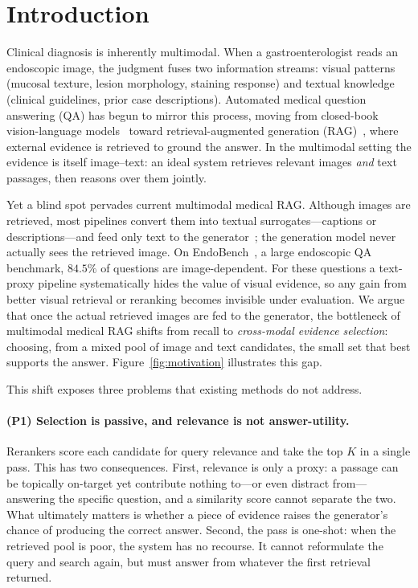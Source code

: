 \section{Introduction}
\label{sec:introduction}

Clinical diagnosis is inherently multimodal. When a gastroenterologist reads an
endoscopic image, the judgment fuses two information streams: visual patterns
(mucosal texture, lesion morphology, staining response) and textual knowledge
(clinical guidelines, prior case descriptions). Automated medical question
answering (QA) has begun to mirror this process, moving from closed-book
vision-language models~\cite{li2023llavamed} toward retrieval-augmented
generation (RAG)~\cite{lewis2020retrieval}, where external evidence is retrieved
to ground the answer. In the multimodal setting the evidence is itself
image--text: an ideal system retrieves relevant images \emph{and} text passages,
then reasons over them jointly.

Yet a blind spot pervades current multimodal medical RAG. Although images are
retrieved, most pipelines convert them into textual
surrogates---captions or descriptions---and feed only text to the
generator~\cite{chen2022murag,yasunaga2023retrieval}; the generation model never
actually sees the retrieved image. On EndoBench~\cite{endobench}, a large
endoscopic QA benchmark, $84.5\%$ of questions are image-dependent. For these
questions a text-proxy pipeline systematically hides the value of visual
evidence, so any gain from better visual retrieval or reranking becomes
invisible under evaluation. We argue that once the actual retrieved images are
fed to the generator, the bottleneck of multimodal medical RAG shifts from
recall to \emph{cross-modal evidence selection}: choosing, from a mixed pool of
image and text candidates, the small set that best supports the answer.
Figure~\ref{fig:motivation} illustrates this gap.

This shift exposes three problems that existing methods do not address.

\paragraph{(P1) Selection is passive, and relevance is not answer-utility.}
Rerankers score each candidate for query relevance and take the top $K$ in a
single pass. This has two consequences. First, relevance is only a proxy: a
passage can be topically on-target yet contribute nothing to---or even distract
from---answering the specific question, and a similarity score cannot separate
the two. What ultimately matters is whether a piece of evidence raises the
generator's chance of producing the correct answer. Second, the pass is
one-shot: when the retrieved pool is poor, the system has no recourse. It cannot
reformulate the query and search again, but must answer from whatever the first
retrieval returned.

